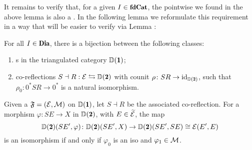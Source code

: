It remains to verify that, for a given $I\in\fincat$, the pointwise \phfs we found in the above lemma is also a \hfs. In the following lemma we reformulate this requirement in a way that will be easier to verify via Lemma :
\begin{lemma}\label{fs_are_corefs}
For all $I\in \Dia$, there is a bijection between the following classes:
\begin{enumerate}
\item {\hfs}s in the triangulated category $\D(\uno)$;
\item co-reflections $S\dashv R: \E\leftrightarrows\D(\due)$ with counit $\rho\colon SR\to \id_{\D(\due)}$, such that $\rho_0\colon 0^*SR\to 0^*$ is a natural isomorphism.
\end{enumerate}
Given a {\hfs} $\mathfrak{F}=(\mathcal{E},\mathcal{M})$ on $\D(\uno)$, let $S\dashv R$ be the associated co-reflection. For a morphism $\varphi\colon SE\to X$ in $\D(\due)$, with $E\in \widetilde{\mathcal{E}}$,  the map
\[
\D(\due)(SE',\varphi)\colon \D(\due)(SE',X)\to \D(\due)(SE',SE)\cong\E(E',E) 
\]
is an isomorphism if and only if $\varphi_0$ is an iso and $\varphi_1\in \mathcal{M}$.
\end{lemma}
